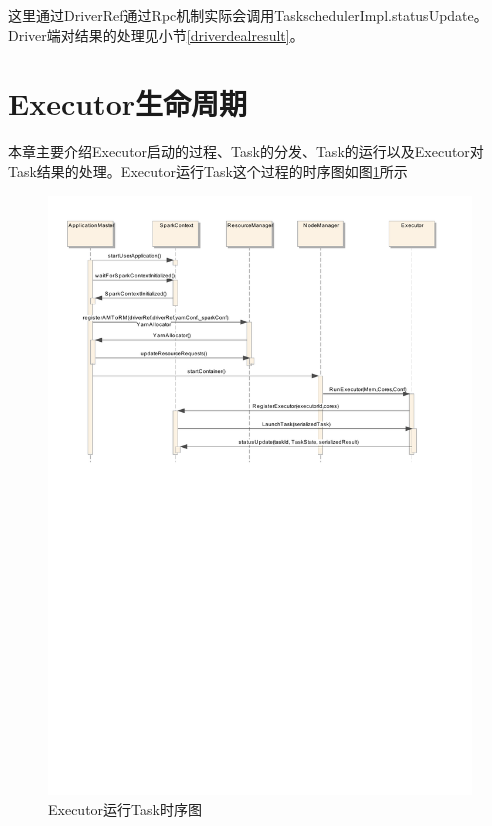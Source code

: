 这里通过DriverRef通过Rpc机制实际会调用TaskschedulerImpl.statusUpdate。Driver端对结果的处理见小节\ref{driverdealresult}。
\section{Executor生命周期}
本章主要介绍Executor启动的过程、Task的分发、Task的运行以及Executor对Task结果的处理。Executor运行Task这个过程的时序图如图\ref{fig:ExecutorRunTask}所示
\begin{figure}[H] 
\centering
\includegraphics[width=\textwidth]{figures/ExecutorRunTask.pdf}
\caption{Executor运行Task时序图}
\label{fig:ExecutorRunTask}
\end{figure}